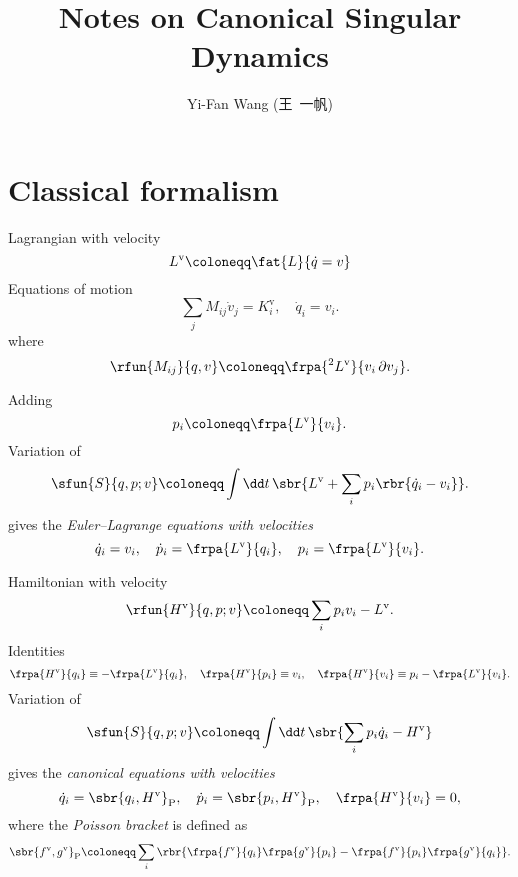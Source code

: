 \documentclass[a4paper,11pt]{article}
\title{Notes on Canonical Singular Dynamics}
\author{Yi-Fan Wang (王\ 一帆)}
\begin{document}
\maketitle

\section{Classical formalism}

Lagrangian with velocity
\begin{equation}
L^\text{v} \coloneqq \fat{L}{\dot{q} = v}
\end{equation}
Equations of motion
\begin{equation}
\sum_j M_{ij}\dot{v}_j = K^\text{v}_i,\quad
\dot{q}_i = v_i.
\end{equation}
where
\begin{equation}
\rfun{M_{ij}}{q,v} \coloneqq \frpa{^2 L^\text{v}}{v_i\,\partial v_j}.
\end{equation}

Adding
\begin{equation}
p_i \coloneqq \frpa{L^\text{v}}{v_i}.%
\end{equation}
Variation of
\begin{equation}
\sfun{S}{q, p; v} \coloneqq \int\dd t\,\sbr{L^\text{v} + \sum_i 
p_i\rbr{\dot{q}_i - v_i}}.
\end{equation}
gives the \emph{Euler--Lagrange equations with velocities}
\begin{equation}
\dot{q}_i = v_i,\quad
\dot{p}_i = \frpa{L^\text{v}}{q_i},\quad
p_i = \frpa{L^\text{v}}{v_i}.
\end{equation}

Hamiltonian with velocity
\begin{equation}
\rfun{H^\text{v}}{q, p; v} \coloneqq \sum_i p_i v_i - L^\text{v}.
\end{equation}
Identities
\begin{equation}
\frpa{H^\text{v}}{q_i} \equiv - \frpa{L^\text{v}}{q_i},\quad
\frpa{H^\text{v}}{p_i} \equiv v_i,\quad
\frpa{H^\text{v}}{v_i} \equiv p_i - \frpa{L^\text{v}}{v_i}.
\end{equation}
Variation of
\begin{equation}
\sfun{S}{q, p; v} \coloneqq \int\dd t\,\sbr{\sum_i 
p_i \dot{q}_i - H^\text{v}}
\end{equation}
gives the \emph{canonical equations with velocities}
\begin{equation}
\dot{q}_i = \sbr{q_i, H^\text{v}}_\text{P},\quad
\dot{p}_i = \sbr{p_i, H^\text{v}}_\text{P},\quad
\frpa{H^\text{v}}{v_i} = 0,
\end{equation}
where the \emph{Poisson bracket} is defined as
\begin{equation}
\sbr{f^\text{v}, g^\text{v}}_\text{P} \coloneqq 
\sum_i\rbr{\frpa{f^\text{v}}{q_i}\frpa{g^\text{v}}{p_i} -
\frpa{f^\text{v}}{p_i}\frpa{g^\text{v}}{q_i}}.
\end{equation}
\end{document}
